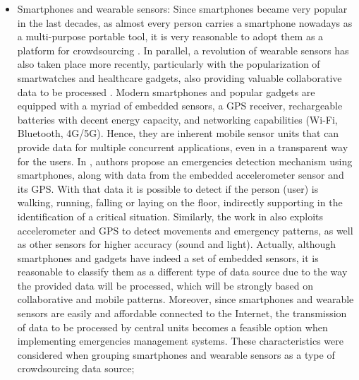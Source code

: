 \begin{refsection}
\begin{itemize}
    \item Smartphones and wearable sensors: Since smartphones became very popular in the last decades, as almost every person carries a smartphone nowadays as a multi-purpose portable tool, it is very reasonable to adopt them as a platform for crowdsourcing \cite{crowdsourcing1}. In parallel, a revolution of wearable sensors has also taken place more recently, particularly with the popularization of smartwatches and healthcare gadgets, also providing valuable collaborative data to be processed \cite{wearable1,wearable2,iotgadget1}. Modern smartphones and popular gadgets are equipped with a myriad of embedded sensors, a GPS receiver, rechargeable batteries with decent energy capacity, and networking capabilities (Wi-Fi, Bluetooth, 4G/5G). Hence, they are inherent mobile sensor units that can provide data for multiple concurrent applications, even in a transparent way for the users. In \cite{crowdsourcing4}, authors propose an emergencies detection mechanism using smartphones, along with data from the embedded accelerometer sensor and its GPS. With that data it is possible to detect if the person (user) is walking, running, falling or laying on the floor, indirectly supporting in the identification of a critical situation. Similarly, the work in \cite{crowdsourcing4} also exploits accelerometer and GPS to detect movements and emergency patterns, as well as other sensors for higher accuracy (sound and light). Actually, although smartphones and gadgets have indeed a set of embedded sensors, it is reasonable to classify them as a different type of data source due to the way the provided data will be processed, which will be strongly based on collaborative and mobile patterns. Moreover, since smartphones and wearable sensors are easily and affordable connected to the Internet, the transmission of data to be processed by central units becomes a feasible option when implementing emergencies management systems. These characteristics were considered when grouping smartphones and wearable sensors as a type of crowdsourcing data source;
    

\end{itemize}
\end{refsection}
